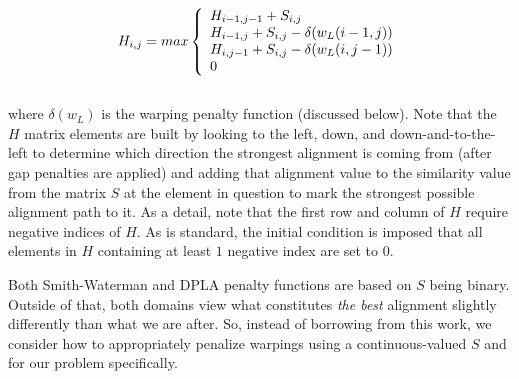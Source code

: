 \documentclass[a4paper,12pt]{report} 	%
\numberwithin{figure}{chapter}
\numberwithin{table}{chapter}
\numberwithin{equation}{chapter}
\begin{document}
\begin{flushleft}
\begin{equation}
H_{i,j} = max\left\{ 
  \begin{array}{l l}
    H_{i-1,j-1}+S_{i,j}\\
    H_{i-1,j}+S_{i,j}-\delta(w_L(i-1,j))\\
    H_{i,j-1}+S_{i,j}-\delta(w_L(i,j-1))\\
    0
   \end{array} \right.
\end{equation}
\\
\vspace{10 mm}
\noindent  where $\delta(w_L)$ is the warping penalty function (discussed below). Note that the $H$ matrix elements are built by looking to the left, down, and down-and-to-the-left to determine which direction the strongest alignment is coming from (after gap penalties are applied) and adding that alignment value to the similarity value from the matrix $S$ at the element in question to mark the strongest possible alignment path to it. As a detail, note that the first row and column of $H$ require negative indices of $H$. As is standard, the initial condition is imposed that all elements in $H$ containing at least $1$ negative index are set to $0$.

Both Smith-Waterman and DPLA penalty functions are based on $S$ being binary. Outside of that, both domains view what constitutes \emph{the best} alignment slightly differently than what we are after. So, instead of borrowing from this work, we consider how to appropriately penalize warpings using a continuous-valued $S$ and for our problem specifically.


\end{flushleft}
\end{document}
